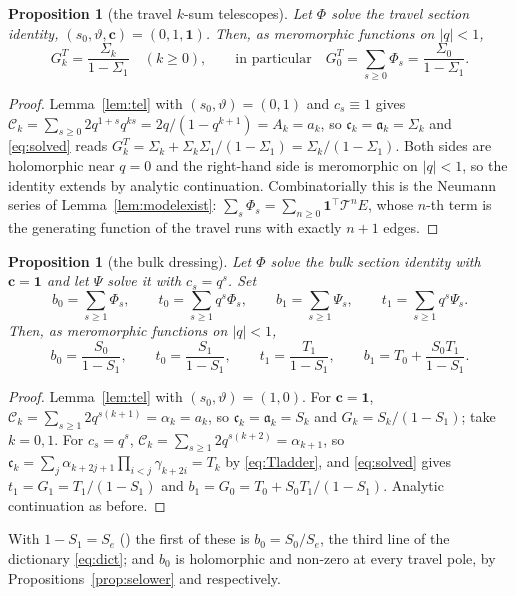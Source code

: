 \documentclass[11pt]{article}
\theoremstyle{plain}
\newtheorem{proposition}[theorem]{Proposition}
\theoremstyle{definition}
\theoremstyle{remark}
\begin{document}
\begin{proposition}[the travel $k$-sum telescopes]\label{prop:travelsum}
Let $\Phi$ solve the travel section identity, $(s_0,\vartheta,\mathbf c)=(0,1,\mathbf 1)$. Then, as
meromorphic functions on $|q|<1$,
\[
  G^{T}_k=\frac{\Sigma_k}{1-\Sigma_1}\quad(k\ge0),\qquad\text{in particular}\quad
  G^{T}_0=\sum_{s\ge0}\Phi_s=\frac{\Sigma_0}{1-\Sigma_1} .
\]
\end{proposition}

\begin{proof}
Lemma~\ref{lem:tel} with $(s_0,\vartheta)=(0,1)$ and $c_s\equiv1$ gives
$\mathcal C_k=\sum_{s\ge0}2q^{1+s}q^{ks}=2q/(1-q^{k+1})=A_k=a_k$, so
$\mathfrak c_k=\mathfrak a_k=\Sigma_k$ and \eqref{eq:solved} reads
$G^T_k=\Sigma_k+\Sigma_k\Sigma_1/(1-\Sigma_1)=\Sigma_k/(1-\Sigma_1)$. Both sides are holomorphic
near $q=0$ and the right-hand side is meromorphic on $|q|<1$, so the identity extends by analytic
continuation. Combinatorially this is the Neumann series of Lemma~\ref{lem:modelexist}:
$\sum_s\Phi_s=\sum_{n\ge0}\mathbf 1^{\!\top}\mathcal T^nE$, whose $n$-th term is the generating
function of the travel runs with exactly $n+1$ edges.
\end{proof}

\begin{proposition}[the bulk dressing]\label{prop:bulkdress}
Let $\Phi$ solve the bulk section identity with $\mathbf c=\mathbf 1$ and let $\Psi$ solve it with
$c_s=q^s$. Set
\[
  b_0=\sum_{s\ge1}\Phi_s,\qquad t_0=\sum_{s\ge1}q^s\Phi_s,\qquad
  b_1=\sum_{s\ge1}\Psi_s,\qquad t_1=\sum_{s\ge1}q^s\Psi_s .
\]
Then, as meromorphic functions on $|q|<1$,
\[
  b_0=\frac{S_0}{1-S_1},\qquad t_0=\frac{S_1}{1-S_1},\qquad
  t_1=\frac{T_1}{1-S_1},\qquad b_1=T_0+\frac{S_0T_1}{1-S_1}.
\]
\end{proposition}

\begin{proof}
Lemma~\ref{lem:tel} with $(s_0,\vartheta)=(1,0)$. For $\mathbf c=\mathbf 1$,
$\mathcal C_k=\sum_{s\ge1}2q^{s(k+1)}=\alpha_k=a_k$, so $\mathfrak c_k=\mathfrak a_k=S_k$ and
$G_k=S_k/(1-S_1)$; take $k=0,1$. For $c_s=q^s$,
$\mathcal C_k=\sum_{s\ge1}2q^{s(k+2)}=\alpha_{k+1}$, so
$\mathfrak c_k=\sum_j\alpha_{k+2j+1}\prod_{i<j}\gamma_{k+2i}=T_k$ by \eqref{eq:Tladder}, and
\eqref{eq:solved} gives $t_1=G_1=T_1/(1-S_1)$ and $b_1=G_0=T_0+S_0T_1/(1-S_1)$. Analytic
continuation as before.
\end{proof}

\noindent With $1-S_1=S_e$ ({\cite[Proposition \textup{prop:qtrig}]{Bonfioli2026bA}}) the first of these is $b_0=S_0/S_e$, the
third line of the dictionary \eqref{eq:dict}; and $b_0$ is holomorphic and non-zero at every travel
pole, by Propositions~\ref{prop:selower} and {\cite[\textup{prop:numnonvanish}]{Bonfioli2026bA}} respectively.
\end{document}
